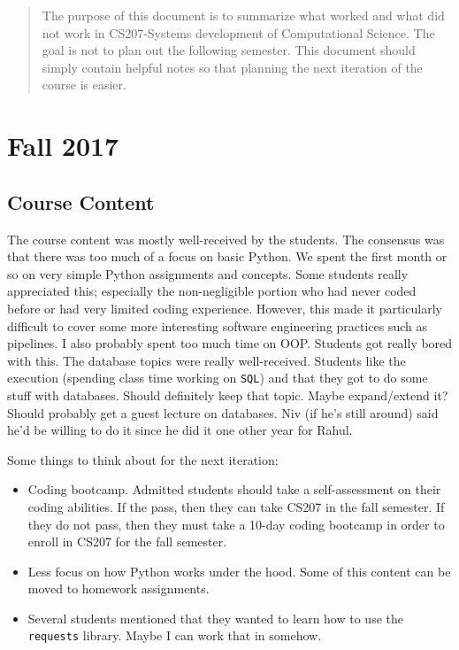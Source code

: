 \documentclass[11pt]{article}
\begin{document}
  \begin{abstract}
    The purpose of this document is to summarize what worked and what did not
work in CS207-Systems development of Computational Science.  The goal is not to
plan out the following semester.  This document should simply contain helpful
notes so that planning the next iteration of the course is easier.
  \end{abstract}

  \section{Fall 2017}
    \subsection{Course Content}
    The course content was mostly well-received by the students.  The consensus
was that there was too much of a focus on basic Python.  We spent the first
month or so on very simple Python assignments and concepts.  Some students
really appreciated this; especially the non-negligible portion who had never
coded before or had very limited coding experience.  However, this made it
particularly difficult to cover some more interesting software engineering
practices such as pipelines.  I also probably spent too much time on OOP.
Students got really bored with this.  The database topics were really
well-received.  Students like the execution (spending class time working on
\texttt{SQL}) and that they got to do some stuff with databases.  Should
definitely keep that topic.  Maybe expand/extend it?  Should probably get a
guest lecture on databases.  Niv (if he's still around) said he'd be willing to
do it since he did it one other year for Rahul.

    Some things to think about for the next iteration:
    \begin{itemize}
      \item Coding bootcamp.  Admitted students should take a self-assessment on
their coding abilities.  If the pass, then they can take CS207 in the fall
semester.  If they do not pass, then they must take a 10-day coding bootcamp in
order to enroll in CS207 for the fall semester.
      \item Less focus on how Python works under the hood.  Some of this content
can be moved to homework assignments.
      \item Several students mentioned that they wanted to learn how to use the
\texttt{requests} library.  Maybe I can work that in somehow.
    \end{itemize}
\end{document}
